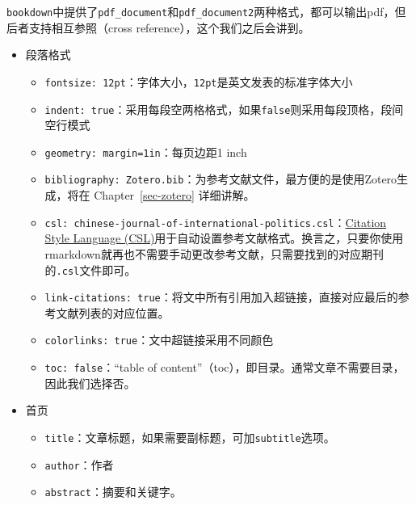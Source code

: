 \documentclass[
  letterpaper,
  DIV=11,
  numbers=noendperiod,
  oneside]{scrreprt}
\providecommand{\tightlist}{%
  \setlength{\itemsep}{0pt}\setlength{\parskip}{0pt}}\usepackage{longtable,booktabs,array}
\begin{document}
\begin{tcolorbox}[enhanced jigsaw, arc=.35mm, breakable, coltitle=black, colframe=quarto-callout-tip-color-frame, toptitle=1mm, colbacktitle=quarto-callout-tip-color!10!white, leftrule=.75mm, left=2mm, bottomtitle=1mm, rightrule=.15mm, title=\textcolor{quarto-callout-tip-color}{\faLightbulb}\hspace{0.5em}{Bookdown输出格式}, opacityback=0, bottomrule=.15mm, titlerule=0mm, opacitybacktitle=0.6, colback=white, toprule=.15mm]
\texttt{bookdown}中提供了\texttt{pdf\_document}和\texttt{pdf\_document2}两种格式，都可以输出pdf，但后者支持相互参照（cross
reference），这个我们之后会讲到。
\end{tcolorbox}

\begin{itemize}
\tightlist
\item
  段落格式

  \begin{itemize}
  \tightlist
  \item
    \texttt{fontsize:\ 12pt}：字体大小，\texttt{12pt}是英文发表的标准字体大小
  \item
    \texttt{indent:\ true}：采用每段空两格格式，如果\texttt{false}则采用每段顶格，段间空行模式
  \item
    \texttt{geometry:\ margin=1in}：每页边距1 inch
  \item
    \texttt{bibliography:\ Zotero.bib}：为参考文献文件，最方便的是使用Zotero生成，将在
    Chapter~\ref{sec-zotero} 详细讲解。
  \item
    \texttt{csl:\ chinese-journal-of-international-politics.csl}：\href{https://citationstyles.org/}{Citation
    Style Language
    (CSL)}用于自动设置参考文献格式。换言之，只要你使用rmarkdown就再也不需要手动更改参考文献，只需要找到的对应期刊的\texttt{.csl}文件即可。
  \item
    \texttt{link-citations:\ true}：将文中所有引用加入超链接，直接对应最后的参考文献列表的对应位置。
  \item
    \texttt{colorlinks:\ true}：文中超链接采用不同颜色
  \item
    \texttt{toc:\ false}：``table of
    content''（toc），即目录。通常文章不需要目录，因此我们选择否。
  \end{itemize}
\item
  首页

  \begin{itemize}
  \tightlist
  \item
    \texttt{title}：文章标题，如果需要副标题，可加\texttt{subtitle}选项。
  \item
    \texttt{author}：作者
  \item
    \texttt{abstract}：摘要和关键字。
  \end{itemize}
\end{itemize}
\end{document}
